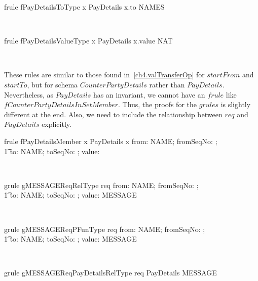\begin{LFRT}
\begin{theorem}{frule fPayDetailsToType}
   x \in PayDetails \implies x.to \in NAMES
\end{theorem}~\end{LFRT}

\begin{LFRT}
\begin{theorem}{frule fPayDetailsValueType}
   x \in PayDetails \implies x.value \in NAT
\end{theorem}~\end{LFRT}

These rules are similar to those found in~\ref{ch4.valTransferOp}
for $startFrom$ and $startTo$, but for schema $CounterPartyDetails$
rather than $PayDetails$. Nevertheless, as $PayDetails$ has an
invariant, we cannot have an $frule$ like
$fCounterPartyDetailsInSetMember$. Thus, the proofs for the $grules$
is slightly different at the end. Also, we need to include the
relationship between $req$ and $PayDetails$ explicitly.
%
\begin{LFRT}
\begin{theorem}{frule fPayDetailsMember}
    x \in  PayDetails \implies  x \in  \lblot from: NAME; fromSeqNo: \nat; \\
        \t1 to: NAME; toSeqNo: \nat; value: \nat \rblot
\end{theorem}~\end{LFRT}

\begin{LGRT}
\begin{theorem}{grule gMESSAGEReqRelType}
   req \in  \lblot from: NAME; fromSeqNo: \nat; \\
        \t1 to: NAME; toSeqNo: \nat; value: \nat \rblot  \rel MESSAGE
\end{theorem}~\end{LGRT}

\begin{LGRT}
\begin{theorem}{grule gMESSAGEReqPFunType}
  req \in  \lblot from: NAME; fromSeqNo: \nat; \\
        \t1 to: NAME; toSeqNo: \nat; value: \nat \rblot  \pfun MESSAGE
\end{theorem}~\end{LGRT}

\begin{LGRT}
\begin{theorem}{grule gMESSAGEReqPayDetailsRelType}
   req \in PayDetails \rel MESSAGE
\end{theorem}~\end{LGRT}

